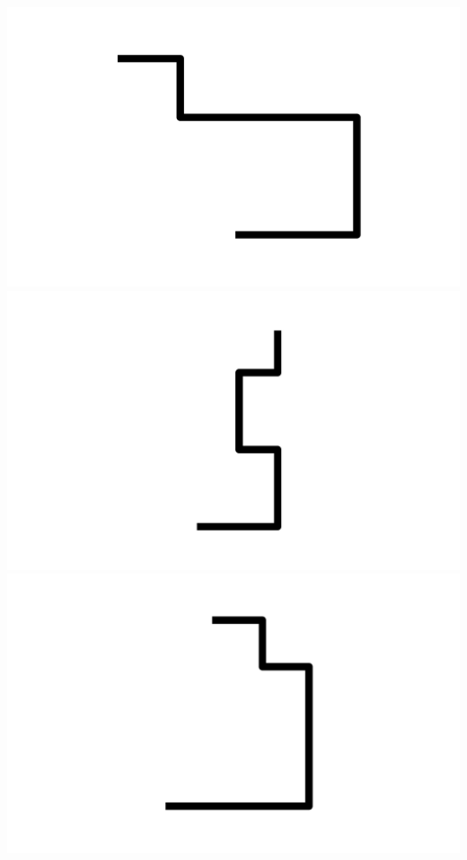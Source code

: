 \documentclass[]{report}
\begin{document}
\includegraphics[scale=.1]{pictures/21/state_cluster_shapes_160.pdf} 
\includegraphics[scale=.1]{pictures/21/state_cluster_shapes_161.pdf} 
\includegraphics[scale=.1]{pictures/21/state_cluster_shapes_162.pdf} 
\end{document}
